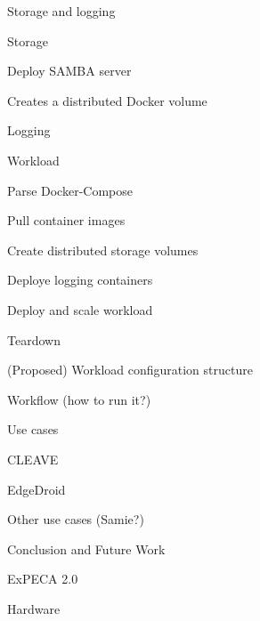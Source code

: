 \begin{outline}
\begin{outline}
\begin{outline}
\begin{outline}
                \item Storage and logging
                \begin{outline}
                    \item Storage
                    \begin{outline}
                        \item Deploy SAMBA server
                        \item Creates a distributed Docker volume
                    \end{outline}
                    \item Logging
                \end{outline}
                \item Workload
                \begin{outline}
                    \item Parse Docker-Compose
                    \item Pull container images
                    \item Create distributed storage volumes
                    \item Deploye logging containers
                    \item Deploy and scale workload
                \end{outline}
                \item Teardown
            \end{outline}
            \item (Proposed) Workload configuration structure
            \item Workflow (how to run it?)
        \end{outline}
    \end{outline}
    \item Use cases
    \begin{outline}
        \item CLEAVE
        \item EdgeDroid
        \item Other use cases (Samie?)
    \end{outline}
    \item{Conclusion and Future Work}
    \begin{outline}
        \item ExPECA 2.0
        \begin{outline}
            \item Hardware
            \begin{outline}

\end{outline}
\end{outline}
\end{outline}
\end{outline}
